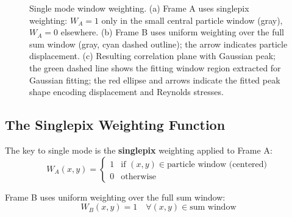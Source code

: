 \documentclass[11pt,a4paper]{article}
\begin{document}
\begin{figure}[h]
\caption{Single mode window weighting. (a) Frame A uses singlepix weighting: $W_A=1$ only in the small central particle window (gray), $W_A=0$ elsewhere. (b) Frame B uses uniform weighting over the full sum window (gray, cyan dashed outline); the arrow indicates particle displacement. (c) Resulting correlation plane with Gaussian peak; the green dashed line shows the fitting window region extracted for Gaussian fitting; the red ellipse and arrows indicate the fitted peak shape encoding displacement and Reynolds stresses.}
\label{fig:single_mode_windows}
\end{figure}

\subsection{The Singlepix Weighting Function}

The key to single mode is the \textbf{singlepix} weighting applied to Frame A:
\begin{equation}
    W_A(x, y) = \begin{cases}
        1 & \text{if } (x,y) \in \text{particle window (centered)} \\
        0 & \text{otherwise}
    \end{cases}
\end{equation}

Frame B uses uniform weighting over the full sum window:
\begin{equation}
    W_B(x, y) = 1 \quad \forall (x,y) \in \text{sum window}
\end{equation}
\end{document}
